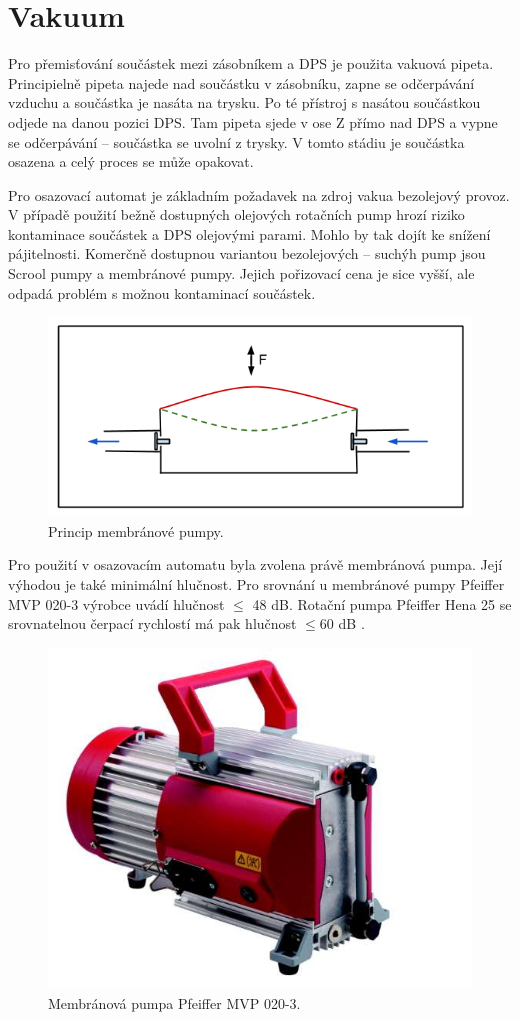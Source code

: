 \chapter{Vakuum}

Pro přemisťování součástek mezi zásobníkem a DPS je použita vakuová pipeta. Principielně pipeta najede nad součástku v zásobníku, zapne se odčerpávání vzduchu a součástka je nasáta na trysku. Po té přístroj s nasátou součástkou odjede na danou pozici DPS. Tam pipeta sjede v ose Z přímo nad DPS a vypne se odčerpávání – součástka se uvolní z trysky. V tomto stádiu je součástka osazena a celý proces se může opakovat.

Pro osazovací automat je základním požadavek na zdroj vakua bezolejový provoz. V případě použití bežně dostupných olejových rotačních pump hrozí riziko kontaminace součástek a DPS olejovými parami. Mohlo by tak dojít ke snížení pájitelnosti. Komerčně dostupnou variantou bezolejových – suchýh pump jsou Scrool pumpy a membránové pumpy. Jejich pořizovací cena je sice vyšší, ale odpadá problém s možnou kontaminací součástek.

\begin{figure}[h!]
  \centering
    \includegraphics[width=0.6\linewidth]{obrazky/membrane.png}%
    \caption{Princip membránové pumpy.}
    \label{fig:membranka}
\end{figure}

Pro použití v osazovacím automatu byla zvolena právě membránová pumpa. Její výhodou je také minimální hlučnost. Pro srovnání u membránové pumpy Pfeiffer MVP 020-3 výrobce uvádí hlučnost $\leq$ 48 dB. Rotační pumpa Pfeiffer Hena 25 se srovnatelnou čerpací rychlostí má pak hlučnost $\leq$60 dB \cite{pfeiffer}.

\begin{figure}[h!]
  \centering
    \includegraphics[width=0.6\linewidth]{obrazky/pfeiffer.jpg}%
    \caption{Membránová pumpa Pfeiffer MVP 020-3\cite{pfeiffer}.}
    \label{fig:pfeiffer}
\end{figure}



